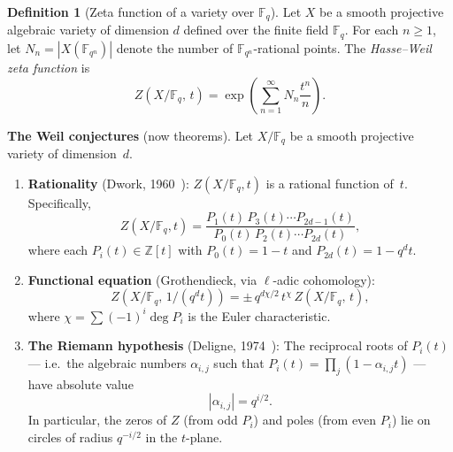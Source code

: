 \documentclass[11pt,a4paper]{article}
\theoremstyle{plain}
\theoremstyle{definition}
\newtheorem{definition}[theorem]{Definition}
\newcommand{\Z}{\mathbb{Z}}
\newcommand{\F}{\mathbb{F}}
\begin{document}
\begin{tcolorbox}[breakable, colback=green!8, colframe=green!8,
  boxrule=0pt, sharp corners]
\begin{definition}[Zeta function of a variety over $\F_q$]
\label{def:weil-zeta}
Let $X$ be a smooth projective algebraic variety of dimension $d$
defined over the finite field $\F_q$. For each $n \geq 1$, let
$N_n = |X(\F_{q^n})|$ denote the number of $\F_{q^n}$-rational
points. The \emph{Hasse--Weil zeta function} is
\begin{equation}
\label{eq:weil-zeta}
  Z(X/\F_q,\, t) = \exp\!\left(\sum_{n=1}^{\infty}
  N_n \frac{t^n}{n}\right).
\end{equation}
\end{definition}
\end{tcolorbox}

\begin{tcolorbox}[breakable, colback=black!5, colframe=black!5,
  boxrule=0pt, sharp corners]
\textbf{The Weil conjectures} (now theorems). Let $X/\F_q$ be a smooth
projective variety of dimension~$d$.

\begin{enumerate}
\item \textbf{Rationality} (Dwork, 1960~\cite{Dwork1960}):
$Z(X/\F_q, t)$ is a rational function of~$t$. Specifically,
\[
  Z(X/\F_q, t)
  = \frac{P_1(t)\, P_3(t) \cdots P_{2d-1}(t)}
         {P_0(t)\, P_2(t) \cdots P_{2d}(t)},
\]
where each $P_i(t) \in \Z[t]$ with $P_0(t) = 1 - t$ and
$P_{2d}(t) = 1 - q^d t$.

\item \textbf{Functional equation} (Grothendieck, via
$\ell$-adic cohomology):
\[
  Z(X/\F_q,\, 1/(q^d t))
  = \pm\, q^{d\chi/2}\, t^{\chi}\, Z(X/\F_q,\, t),
\]
where $\chi = \sum (-1)^i \deg P_i$ is the Euler characteristic.

\item \textbf{The Riemann hypothesis} (Deligne, 1974~\cite{Deligne1974}):
The reciprocal roots of $P_i(t)$ --- i.e.\ the algebraic numbers
$\alpha_{i,j}$ such that
$P_i(t) = \prod_j (1 - \alpha_{i,j} t)$ --- have absolute value
\begin{equation}
\label{eq:deligne-rh}
  |\alpha_{i,j}| = q^{i/2}.
\end{equation}
In particular, the zeros of $Z$ (from odd $P_i$) and poles (from even
$P_i$) lie on circles of radius $q^{-i/2}$ in the $t$-plane.
\end{enumerate}
\end{tcolorbox}
\end{document}
